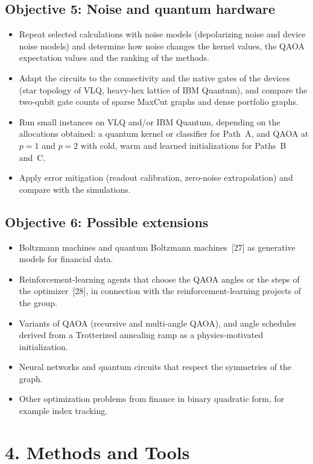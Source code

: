 \documentclass[12pt,a4paper]{article}
\begin{document}
\subsection*{Objective 5: Noise and quantum hardware}
\begin{itemize}
  \item Repeat selected calculations with noise models (depolarizing
  noise and device noise models) and determine how noise changes the
  kernel values, the QAOA expectation values and the ranking of the
  methods.
  \item Adapt the circuits to the connectivity and the native gates of
  the devices (star topology of VLQ, heavy-hex lattice of IBM
  Quantum), and compare the two-qubit gate counts of sparse MaxCut
  graphs and dense portfolio graphs.
  \item Run small instances on VLQ and/or IBM Quantum, depending on
  the allocations obtained: a quantum kernel or classifier for Path~A,
  and QAOA at $p=1$ and $p=2$ with cold, warm and learned
  initializations for Paths~B and~C.
  \item Apply error mitigation (readout calibration, zero-noise
  extrapolation) and compare with the simulations.
\end{itemize}

\subsection*{Objective 6: Possible extensions}
\begin{itemize}
  \item Boltzmann machines and quantum Boltzmann machines~[27] as
  generative models for financial data.
  \item Reinforcement-learning agents that choose the QAOA angles or
  the steps of the optimizer~[28], in connection with the
  reinforcement-learning projects of the group.
  \item Variants of QAOA (recursive and multi-angle QAOA), and angle
  schedules derived from a Trotterized annealing ramp as a
  physics-motivated initialization.
  \item Neural networks and quantum circuits that respect the
  symmetries of the graph.
  \item Other optimization problems from finance in binary quadratic
  form, for example index tracking.
\end{itemize}

\section*{4. Methods and Tools}
\end{document}
